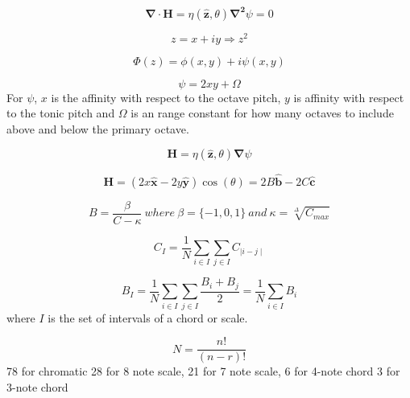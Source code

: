 \documentclass[sn-mathphys]{sn-jnl}%
\begin{document}
\begin{equation}
  \boldsymbol{\nabla \cdot H}=\eta(\boldsymbol{\hat{z}},\theta)\boldsymbol{\nabla^2}\psi = 0  \label{laplaceEq}
\end{equation}

\begin{equation}
  z = x + iy \Rightarrow z^2
\end{equation}

\begin{equation}
  \Phi(z) = \phi(x,y) + i \psi(x,y)
\end{equation}

\begin{equation}
  \psi=2xy + \Omega
\end{equation}
For $\psi$, $x$ is the affinity with respect to the octave pitch, $y$ is affinity with respect to the tonic pitch and $\Omega$ is an range constant for how many octaves to include above and below the primary octave.

\begin{equation}
  \boldsymbol{H}=\eta(\boldsymbol{\hat{z}},\theta)\boldsymbol{\nabla}\psi \label{harmonyEq}
\end{equation}

\begin{equation}
  \boldsymbol{H}=(2x\boldsymbol{\hat{x}} - 2y\boldsymbol{\hat{y}})\cos(\theta) = 2B\boldsymbol{\hat{b}} - 2C\boldsymbol{\hat{c}} \label{consonanceEq}
\end{equation}

\begin{equation}
  B=\frac{\beta}{C-\kappa} \ where \ \beta=\{-1,0,1\}  \ and \  \kappa = \sqrt[\Delta]{C_{max}} \label{brillianceEq}
\end{equation}

\begin{equation}
  C_{I}=\frac{1}{N}\sum\limits_{i \in I}\sum\limits_{j \in I} C_{\mid i-j \mid}  \label{consonanceChordEq}
\end{equation}

\begin{equation}
  B_{I}=\frac{1}{N}\sum\limits_{i \in I}\sum\limits_{j \in I}\frac{ B_{i}+B_{j}}{2}=\frac{1}{N}\sum\limits_{i \in I}B_{i}  \label{brillianceChordEq}
\end{equation}
where $I$ is the set of intervals of a chord or scale.

\begin{equation}
  N=\frac{n!}{(n-r)!}  \label{combinationsEq}
\end{equation}
78 for chromatic
28 for 8 note scale,
21 for 7 note scale,
6 for 4-note chord
3 for 3-note chord
\end{document}

